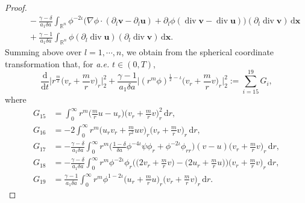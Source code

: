 \documentclass[11pt,reqno]{amsart}
\DeclareMathOperator{\diver}{\mathrm{div}}
\numberwithin{rk}{section}
\numberwithin{prop}{section}
\numberwithin{mydef}{section}
\numberwithin{lem}{section}
\numberwithin{equation}{section}
\numberwithin{thm}{section}
\begin{document}
\begin{proof}
\begin{equation}
\begin{aligned}
&\quad - \frac{\gamma-\delta}{a_1\delta a}\int_{\mathbb{R}^n} \phi^{-2\iota}\big(\nabla\phi\cdot(\partial_l\boldsymbol{v}-\partial_l\boldsymbol{u})+\partial_l\phi(\diver\boldsymbol{v}-\diver\boldsymbol{u})\big)(\partial_l\diver\boldsymbol{v})\,\mathrm{d}\boldsymbol{x}\\
&\quad + \frac{\gamma-1}{a_1\delta a}\int_{\mathbb{R}^n}  \phi(\partial_l\diver\boldsymbol{u}) (\partial_l\diver\boldsymbol{v})\,\mathrm{d}\boldsymbol{x}.
\end{aligned}    
\end{equation}
Summing  above over $l=1,\cdots\!,n$, we obtain from the spherical coordinate transformation that, for {\it a.e.} $t\in (0,T)$,
\begin{equation}\label{nabla2-v}
\frac{\mathrm{d}}{\mathrm{d}t}\Big|r^\frac{m}{2}\big(v_r+\frac{m}{r}v\big)_{r}\Big|_2^2+\frac{\gamma-1}{a_1\delta a}\Big|(r^m\phi)^{\frac{1}{2}-\iota}\big(v_r+\frac{m}{r}v\big)_{r}\Big|_2^2:=\sum_{i=15}^{19}G_i,
\end{equation}
where
\begin{align*}
G_{15}&=\int_0^\infty  r^m\big(\frac{m}{r}u- u_r\big)\big(v_r+\frac{m}{r}v\big)_{r}^2\,\mathrm{d}r,\\
G_{16}&=-2\int_0^\infty r^m\Big(u_rv_r+\frac{m}{r^2}uv\Big)_r\big(v_r+\frac{m}{r}v\big)_{r}\,\mathrm{d}r,\\
G_{17}&= -\frac{\gamma-\delta}{a_1\delta a}\int_0^\infty r^m\big(\frac{1-\delta}{\delta a}\phi^{-4\iota}\psi \phi_r+\phi^{-2\iota}\phi_{rr}\big)(v-u)\big(v_r+\frac{m}{r}v\big)_{r}\,\mathrm{d}r,\\
G_{18}&=-\frac{\gamma-\delta}{a_1\delta a}\int_0^\infty r^m \phi^{-2\iota}\phi_{r}\Big(\big(2v_r+\frac{m}{r}v\big)-\big(2u_r+\frac{m}{r}u\big)\Big)\big(v_r+\frac{m}{r}v\big)_{r}\,\mathrm{d}r,\\
G_{19}&=\frac{\gamma-1}{a_1\delta a}\int_0^\infty  r^m\phi^{1-2\iota} \big(u_r+\frac{m}{r}u\big)_{r}\big(v_r+\frac{m}{r}v\big)_{r}\,\mathrm{d}r.
\end{align*}


\end{proof}
\end{document}
